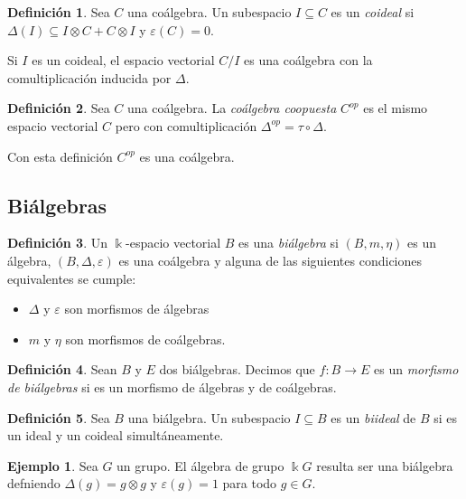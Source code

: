 \documentclass[a4paper,oneside,fleqn,11pt]{report}
\newcommand\ox{\otimes}
\newcommand\field{\Bbbk}
\newcommand{\veps}{\varepsilon}
\theoremstyle{definition}
\newtheorem{definition}{Definición}[section]
\theoremstyle{definition}
\newtheorem{example}{Ejemplo}[section]
\numberwithin{prop}{subsection}
\begin{document}
\begin{definition}
	Sea $C$ una coálgebra. Un subespacio $I \subseteq C$ es un \emph{coideal} si $\Delta(I) \subseteq I \ox C + C \ox I$ y $\veps(C) = 0$.
\end{definition}

Si $I$ es un coideal, el espacio vectorial $C/I$ es una coálgebra con la comultiplicación inducida por $\Delta$.

\begin{definition}
	Sea $C$ una coálgebra. La \emph{coálgebra coopuesta} $C^{op}$ es el mismo espacio vectorial $C$ pero con
	comultiplicación $\Delta^{op} = \tau \circ \Delta$.
\end{definition}
Con esta definición $C^{op}$ es una coálgebra.

\subsection{Biálgebras}

\begin{definition}
	Un $\field$-espacio vectorial $B$ es una \emph{biálgebra} si $\left(B, m, \eta\right)$ es un álgebra,
	$\left(B, \Delta, \veps \right)$ es una coálgebra y alguna de las siguientes condiciones equivalentes
	se cumple:
	\begin{itemize}
		\item $\Delta$ y $\veps$ son morfismos de álgebras
		\item $m$ y $\eta$ son morfismos de coálgebras.
	\end{itemize}
\end{definition}

\begin{definition}
	Sean $B$ y $E$ dos biálgebras. Decimos que $f: B \to E$ es un \emph{morfismo de biálgebras} si
	es un morfismo de álgebras y de coálgebras.
\end{definition}

\begin{definition}
	Sea $B$ una biálgebra. Un subespacio $I \subseteq B$ es un \emph{biideal} de $B$ si es un ideal y un coideal
	simultáneamente.
\end{definition}

\begin{example}
	Sea $G$ un grupo. El álgebra de grupo $\field G$ resulta ser una biálgebra defniendo $\Delta(g) = g \ox g$
	y $\veps(g) = 1$ para todo $g \in G$. 
\end{example}
\end{document}
